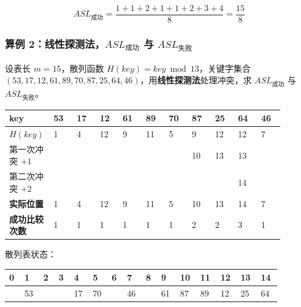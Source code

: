 \documentclass[11pt,openany,UTF8]{ctexbook}
\begin{document}
\[ASL_{成功}=\frac{1+1+2+1+1+2+3+4}{8}=\frac{15}{8}\]

\subsubsection{算例 2：线性探测法，$ASL_{成功}$ 与 $ASL_{失败}$}

设表长 $m=15$，散列函数 $H(key)=key\bmod 13$，关键字集合 $(53,17,12,61,89,70,87,25,64,46)$，用\textbf{线性探测法}处理冲突，求 $ASL_{成功}$ 与 $ASL_{失败}$。

\begingroup\footnotesize\setlength{\tabcolsep}{2.0pt}
\begin{longtable}{@{}L{0.0835\linewidth}L{0.0802\linewidth}L{0.0802\linewidth}L{0.0802\linewidth}L{0.0802\linewidth}L{0.0802\linewidth}L{0.0802\linewidth}L{0.0802\linewidth}L{0.0802\linewidth}L{0.0802\linewidth}L{0.0802\linewidth}@{}}
\toprule
\textbf{key} & \textbf{53} & \textbf{17} & \textbf{12} & \textbf{61} & \textbf{89} & \textbf{70} & \textbf{87} & \textbf{25} & \textbf{64} & \textbf{46} \\
\midrule
\endhead
$H(key)$ & 1 & 4 & 12 & 9 & 11 & 5 & 9 & 12 & 12 & 7 \\
第一次冲突 $+1$ &  &  &  &  &  &  & 10 & 13 & 13 &  \\
第二次冲突 $+2$ &  &  &  &  &  &  &  &  & 14 &  \\
\textbf{实际位置} & 1 & 4 & 12 & 9 & 11 & 5 & 10 & 13 & 14 & 7 \\
\textbf{成功比较次数} & 1 & 1 & 1 & 1 & 1 & 1 & 2 & 2 & 3 & 1 \\
\bottomrule
\end{longtable}
\endgroup

散列表状态：

\begingroup\footnotesize\setlength{\tabcolsep}{1.5pt}
\begin{longtable}{@{}L{0.0589\linewidth}L{0.0589\linewidth}L{0.0589\linewidth}L{0.0589\linewidth}L{0.0589\linewidth}L{0.0589\linewidth}L{0.0589\linewidth}L{0.0589\linewidth}L{0.0589\linewidth}L{0.0589\linewidth}L{0.0589\linewidth}L{0.0589\linewidth}L{0.0589\linewidth}L{0.0589\linewidth}L{0.0589\linewidth}@{}}
\toprule
\textbf{0} & \textbf{1} & \textbf{2} & \textbf{3} & \textbf{4} & \textbf{5} & \textbf{6} & \textbf{7} & \textbf{8} & \textbf{9} & \textbf{10} & \textbf{11} & \textbf{12} & \textbf{13} & \textbf{14} \\
\midrule
\endhead
 & 53 &  &  & 17 & 70 &  & 46 &  & 61 & 87 & 89 & 12 & 25 & 64 \\
\bottomrule
\end{longtable}
\endgroup
\end{document}
